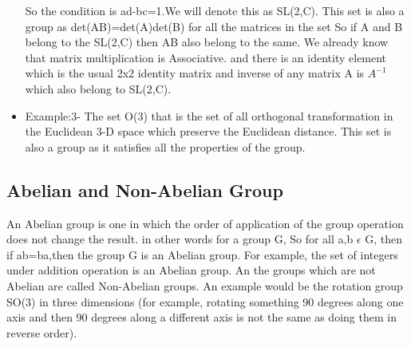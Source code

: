 \begin{itemize}
    So the condition is ad-bc=1.We will denote this as SL(2,C). This set is also a group as det(AB)=det(A)det(B) for all the matrices in the set So if A and B belong to the SL(2,C) then AB also belong to the same. We already know that matrix multiplication is Associative. and there is an identity element which is the usual 2x2 identity matrix and inverse of any matrix A is $A^{-1}$ which also belong to SL(2,C).
    \item Example:3- The set O(3) that is the set of all orthogonal transformation in the Euclidean 3-D space which preserve the Euclidean distance. This set is also a group as it satisfies all the properties of the group.
    
\end{itemize}

\subsection{Abelian and Non-Abelian Group}
An Abelian group is one in which the order of application of the group operation does not change the result. in other words for a group G, So for all a,b $\epsilon$ G, then if ab=ba,then the group G is an Abelian group. For example, the set of integers under addition operation is an Abelian group. An the groups which are not Abelian are called Non-Abelian groups. An example would be the rotation group SO(3) in three dimensions (for example, rotating something 90 degrees along one axis and then 90 degrees along a different axis is not the same as doing them in reverse order).



